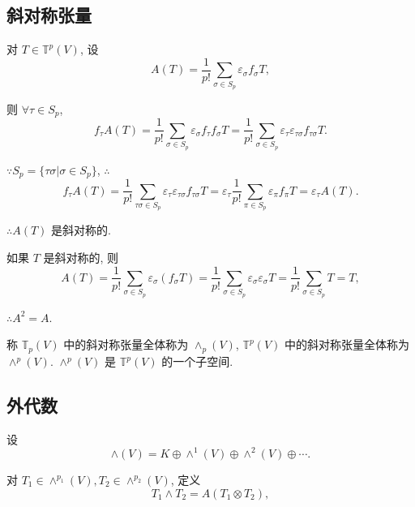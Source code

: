 \documentclass{ctexart}
\begin{document}
\subsection{斜对称张量}
对 $T\in\mathbb{T}^p(V)$, 设
\[A(T)=\dfrac{1}{p!}\sum\limits_{\sigma\in S_p}\varepsilon_\sigma f_\sigma T,\]

则 $\forall\tau\in S_p$,
\[f_\tau A(T)=\dfrac{1}{p!}\sum\limits_{\sigma\in S_p}\varepsilon_\sigma f_\tau f_\sigma T=\dfrac{1}{p!}\sum\limits_{\sigma\in S_p}\varepsilon_\tau\varepsilon_{\tau\sigma}f_{\tau\sigma}T.\]

$\because S_p=\{\tau\sigma|\sigma\in S_p\}$, $\therefore$
\[f_\tau A(T)=\dfrac{1}{p!}\sum\limits_{\tau\sigma\in S_p}\varepsilon_\tau\varepsilon_{\tau\sigma}f_{\tau\sigma}T=\varepsilon_\tau\dfrac{1}{p!}\sum\limits_{\pi\in S_p}\varepsilon_\pi f_\pi T=\varepsilon_\tau A(T).\]

$\therefore A(T)$ 是斜对称的.

如果 $T$ 是斜对称的, 则
\[A(T)=\dfrac{1}{p!}\sum\limits_{\sigma\in S_p}\varepsilon_\sigma(f_\sigma T)=\dfrac{1}{p!}\sum\limits_{\sigma\in S_p}\varepsilon_\sigma\varepsilon_\sigma T=\dfrac{1}{p!}\sum\limits_{\sigma\in S_p}T=T,\]

$\therefore A^2=A$.

称 $\mathbb{T}_p(V)$ 中的斜对称张量全体称为 $\land_p(V)$, $\mathbb{T}^p(V)$ 中的斜对称张量全体称为 $\land^p(V)$. $\land^p(V)$ 是 $\mathbb{T}^p(V)$ 的一个子空间.
\subsection{外代数}
设
\[\land(V)=K\oplus\land^1(V)\oplus\land^2(V)\oplus\cdots.\]

对 $T_1\in\land^{p_1}(V),T_2\in\land^{p_2}(V)$, 定义
\[T_1\land T_2=A(T_1\otimes T_2),\]
\end{document}
